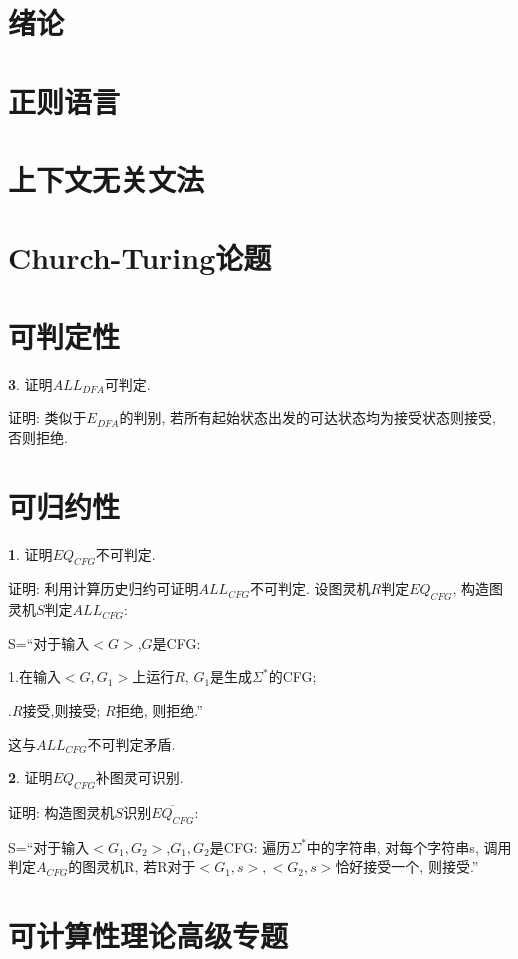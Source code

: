 \section{绪论}
\section{正则语言}
\section{上下文无关文法}
\section{Church-Turing论题}

\section{可判定性}

\par \textbf{3}. 证明$ALL_{DFA}$可判定.
\par 证明: 类似于$E_{DFA}$的判别, 若所有起始状态出发的可达状态均为接受状态则接受, 否则拒绝.

\section{可归约性}

\par \textbf{1}. 证明$EQ_{CFG}$不可判定.
\par 证明: 利用计算历史归约可证明$ALL_{CFG}$不可判定. 设图灵机$R$判定$EQ_{CFG}$, 构造图灵机$S$判定$ALL_{CFG}$:
\par S=``对于输入$<G>$,$G$是CFG:
\par \quad 1.在输入$<G,G_1>$上运行$R$, $G_1$是生成$\Sigma^*$的CFG;
\par {}.$R$接受,则接受; $R$拒绝, 则拒绝.''
\par 这与$ALL_{CFG}$不可判定矛盾.

\par \textbf{2}. 证明$EQ_{CFG}$补图灵可识别.
\par 证明: 构造图灵机$S$识别$\overline{EQ_{CFG}}$:
\par S=``对于输入$<G_1,G_2>$,$G_1,G_2$是CFG: 遍历$\Sigma^*$中的字符串, 对每个字符串s, 调用判定$A_{CFG}$的图灵机R, 若R对于$<G_1,s>,<G_2,s>$恰好接受一个, 则接受.''


\section{可计算性理论高级专题}